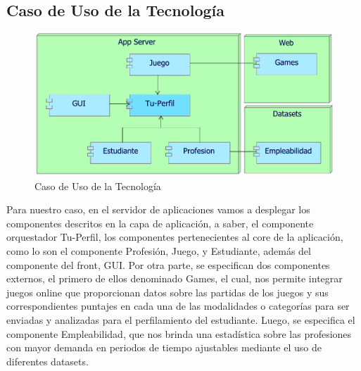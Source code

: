 
\subsection{Caso  de  Uso de la Tecnología}
\begin{figure}[h!]
	\centering
	\includegraphics[width=.8\linewidth]{imgs/puntos_vista/tecnologia/uso.pdf}
	\caption{Caso de Uso de la Tecnología}
\end{figure}

Para nuestro caso, en el servidor de aplicaciones vamos a desplegar los componentes descritos en la capa de aplicación, a saber, el componente orquestador Tu-Perfil, los componentes pertenecientes al core de la aplicación, como lo son el componente Profesión, Juego, y Estudiante, además del componente del front, GUI. Por otra parte, se especifican dos componentes externos, el primero de ellos denominado Games, el cual, nos permite integrar juegos online que proporcionan datos sobre las partidas de los juegos y sus correspondientes puntajes en cada una de las modalidades o categorías para ser enviadas y analizadas para el perfilamiento del estudiante. Luego, se especifica el componente Empleabilidad, que nos brinda una estadística sobre las profesiones con mayor demanda en periodos de tiempo ajustables mediante el uso de diferentes datasets. 